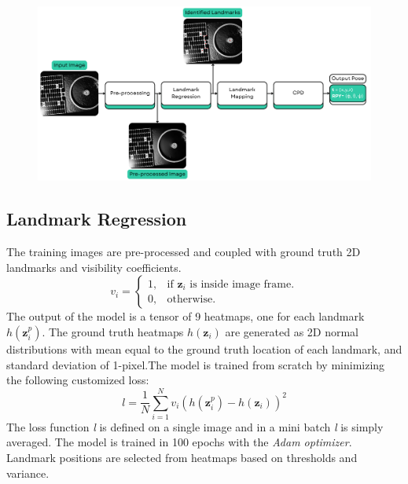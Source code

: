 \documentclass[conference]{IEEEtran}
\begin{document}
\begin{figure}[t]
\centering
\includegraphics[scale=0.5]{Online Pipeline.png}
\label{fig}
\end{figure}

\subsection{Landmark Regression}
The training images are pre-processed and coupled with ground truth 2D landmarks and visibility coefficients.
\[
  v_{i}=\begin{cases}
    1, & \text{if $\textbf{z}_{i}$ is inside image frame}.\\
    0, & \text{otherwise}.
  \end{cases}
\]
The output of the model is a tensor of 9 heatmaps, one for each landmark $h(\textbf{z}_{i}^p)$. The ground truth heatmaps $h(\textbf{z}_{i})$ are generated as 2D normal distributions with mean equal to the ground truth location of each landmark, and standard deviation of 1-pixel.The model is trained from scratch by minimizing the following customized loss:
\[l = \frac{1}{N}\sum_{i=1}^N v_i(h(\textbf{z}_{i}^p) - h(\textbf{z}_{i}))^2\]
The loss function \textit{l} is defined on a single image and in a mini batch \textit{l} is simply averaged. The model is trained in 100 epochs with the \textit{Adam optimizer}.
Landmark positions are selected from heatmaps based on thresholds and variance.
\end{document}
